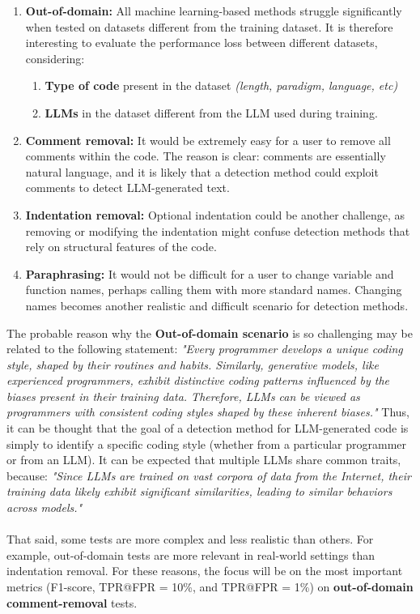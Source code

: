 \begin{enumerate}
\item \textbf{Out-of-domain:} All machine learning-based methods struggle significantly 
when tested on datasets different from the training dataset. It is therefore 
interesting to evaluate the performance loss between different datasets, considering:
    \begin{enumerate}
    \item \textbf{Type of code} present in the dataset \textit{(length, paradigm, language, etc)}
    \item \textbf{LLMs} in the dataset different from the LLM used during training.
    \end{enumerate}
\item \textbf{Comment removal:} It would be extremely easy for a user to remove all 
comments within the code. The reason is clear: comments are essentially 
natural language, and it is likely that a detection method could exploit 
comments to detect LLM-generated text.

\item \textbf{Indentation removal:} Optional indentation could be another challenge, 
as removing or modifying the indentation might confuse detection methods 
that rely on structural features of the code.

\item \textbf{Paraphrasing:} It would not be difficult for a user to change variable and 
function names, perhaps calling them with more standard names. 
Changing names becomes another realistic and difficult scenario for detection methods.
\end{enumerate}

The probable reason why the \textbf{Out-of-domain scenario} is so challenging 
may be related to the following statement:
\textit{"Every programmer develops a unique coding style, shaped by their 
routines and habits. Similarly, generative models, like experienced 
programmers, exhibit distinctive coding patterns influenced by the 
biases present in their training data. Therefore, LLMs can be viewed 
as programmers with consistent coding styles shaped by these inherent biases."}
\cite{ye2023uncovering}
Thus, it can be thought that the goal of a detection method for 
LLM-generated code is simply to identify a specific coding style 
(whether from a particular programmer or from an LLM). 
It can be expected that multiple LLMs share common traits, because:
\textit{"Since LLMs are trained on vast corpora of data from the Internet, 
their training data likely exhibit significant similarities, leading 
to similar behaviors across models."}\cite{guo2024biscope}
\\\\
That said, some tests are more complex and less realistic 
than others. For example, out-of-domain tests are more relevant 
in real-world settings than indentation removal. For these reasons, 
the focus will be on the most important metrics 
(F1-score, TPR@FPR = 10\%, and TPR@FPR = 1\%) 
on \textbf{out-of-domain} \textbf{comment-removal} tests.

